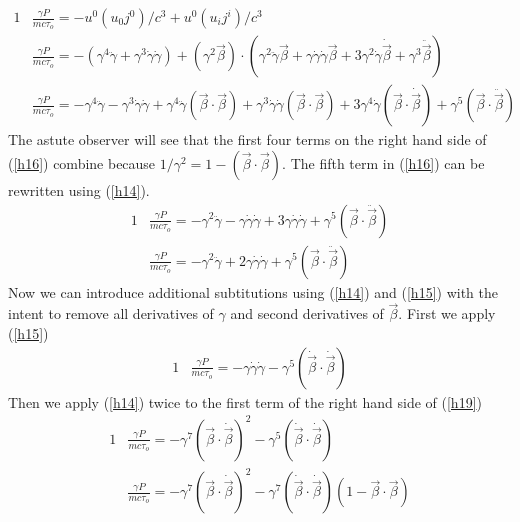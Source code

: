 \documentclass[]{article}
\numberwithin{equation}{subsection}
\begin{document}
	\begin{alignat}{1}
	\label{hh01}		&\frac{\gamma P}{mc\tau_{o}}=-u^{0}(u_{0}j^{0})/c^{3}+u^{0}(u_{i}j^{i})/c^{3}\\
	\label{hh02}		&\frac{\gamma P}{mc\tau_{o}}=-(\gamma^{4}\ddot{\gamma}+\gamma^{3}\dot{\gamma}\dot{\gamma})+(\gamma^{2}\vec{\beta})\cdot(\gamma^{2}\ddot{\gamma}\vec{\beta}+\gamma\dot{\gamma}\dot{\gamma}\vec{\beta}+3\gamma^{2}\dot{\gamma}\dot{\vec{\beta}}+\gamma^{3}\ddot{\vec{\beta}})\\
	\label{h16}		&\frac{\gamma P}{mc\tau_{o}}=-\gamma^{4}\ddot{\gamma}-\gamma^{3}\dot{\gamma}\dot{\gamma}+\gamma^{4}\ddot{\gamma}(\vec{\beta}\cdot\vec{\beta})+\gamma^{3}\dot{\gamma}\dot{\gamma}(\vec{\beta}\cdot\vec{\beta})+3\gamma^{4}\dot{\gamma}(\vec{\beta}\cdot\dot{\vec{\beta}})+\gamma^{5}(\vec{\beta}\cdot\ddot{\vec{\beta}})
	\end{alignat}
The astute observer will see that the first four terms on the right hand side of (\ref{h16}) combine because $1/\gamma^{2}=1-(\vec{\beta}\cdot\vec{\beta})$. The fifth term in (\ref{h16}) can be rewritten using (\ref{h14}).
	\begin{alignat}{1}
	\label{h17}		&\frac{\gamma P}{mc\tau_{o}}=-\gamma^{2}\ddot{\gamma}-\gamma\dot{\gamma}\dot{\gamma}+3\gamma\dot{\gamma}\dot{\gamma}+\gamma^{5}(\vec{\beta}\cdot\ddot{\vec{\beta}})\\
	\label{h18}		&\frac{\gamma P}{mc\tau_{o}}=-\gamma^{2}\ddot{\gamma}+2\gamma\dot{\gamma}\dot{\gamma}+\gamma^{5}(\vec{\beta}\cdot\ddot{\vec{\beta}})
        \end{alignat}
Now we can introduce additional subtitutions using (\ref{h14}) and (\ref{h15}) with the intent to remove all derivatives of $\gamma$ and second derivatives of $\vec{\beta}$. First we apply (\ref{h15})
        \begin{alignat}{1}
	\label{h19}		&\frac{\gamma P}{mc\tau_{o}}=-\gamma\dot{\gamma}\dot{\gamma}-\gamma^{5}(\dot{\vec{\beta}}\cdot\dot{\vec{\beta}})
	\end{alignat}
Then we apply (\ref{h14}) twice to the first term of the right hand side of (\ref{h19})
        \begin{alignat}{1}
	\label{h20}		&\frac{\gamma P}{mc\tau_{o}}=-\gamma^{7}(\vec{\beta}\cdot\dot{\vec{\beta}})^{2}-\gamma^{5}(\dot{\vec{\beta}}\cdot\dot{\vec{\beta}})\\
	\label{h21}		&\frac{\gamma P}{mc\tau_{o}}=-\gamma^{7}(\vec{\beta}\cdot\dot{\vec{\beta}})^{2}-\gamma^{7}(\dot{\vec{\beta}}\cdot\dot{\vec{\beta}})(1-\vec{\beta}\cdot\vec{\beta})
	\end{alignat}
\end{document}
